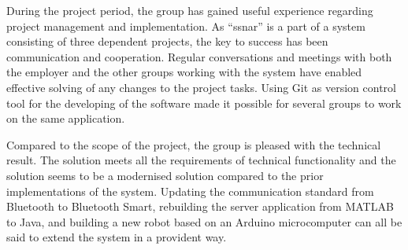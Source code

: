During the project period, the group has gained useful experience regarding project management and implementation. As ``\acrfull{ssnar}'' is a part of a system consisting of three dependent projects, the key to success has been communication and cooperation. Regular conversations and meetings with both the employer and the other groups working with the system have enabled effective solving of any changes to the project tasks. Using Git as version control tool for the developing of the software made it possible for several groups to work on the same application.

Compared to the scope of the project, the group is pleased with the technical result. The solution meets all the requirements of technical functionality and the solution seems to be a modernised solution compared to the prior implementations of the system. Updating the communication standard from Bluetooth to Bluetooth Smart, rebuilding the server application from MATLAB to Java, and building a new robot based on an Arduino microcomputer can all be said to extend the system in a provident way.